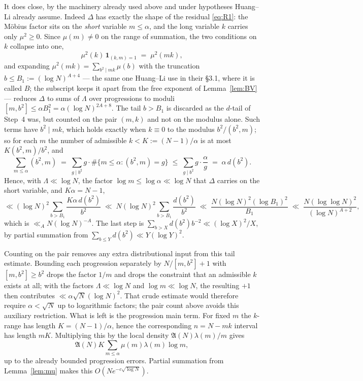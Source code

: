 \documentclass[11pt,a4paper]{article}
\theoremstyle{plain}
\theoremstyle{definition}
\theoremstyle{remark}
\newcommand{\AAA}{\mathfrak{A}}
\begin{document}
It does close, by the machinery already used above and under
hypotheses Huang--Li already assume. Indeed $\Delta$ has exactly the
shape of the residual \eqref{eq:R1}: the M\"obius factor sits on the
\emph{short} variable $m\le\alpha$, and the long variable $k$ carries
only $\mu^2\ge0$. Since $\mu(m)\neq0$ on the range of summation, the
two conditions on $k$ collapse into one,
\begin{equation}\label{eq:mu2mk}
  \mu^2(k)\,\mathbf 1_{(k,m)=1}\;=\;\mu^2(mk),
\end{equation}
and expanding $\mu^2(mk)=\sum_{b^2\mid mk}\mu(b)$ with the truncation
$b\le B_1:=(\log N)^{A+4}$ --- the same one Huang--Li use in their
\S3.1, where it is called $B$; the subscript keeps it apart from the
free exponent of Lemma~\ref{lem:BV} --- reduces $\Delta$ to sums of
$\Lambda$ over progressions to moduli
$[m,b^2]\le\alpha B_1^2=\alpha(\log N)^{2A+8}$. The tail $b>B_1$ is
discarded as the $d$-tail of Step~4 was, but counted on the pair
$(m,k)$ and not on the modulus alone. Such terms have $b^2\mid mk$,
which holds exactly when $k\equiv0$ to the modulus $b^2/(b^2,m)$; so
for each $m$ the number of admissible $k<K:=(N-1)/\alpha$ is at most
$K(b^2,m)/b^{2}$, and
\[
  \sum_{m\le\alpha}(b^2,m)
   \;=\;\sum_{g\mid b^2}g\cdot\#\{m\le\alpha:(b^2,m)=g\}
   \;\le\;\sum_{g\mid b^2}g\cdot\frac{\alpha}{g}
   \;=\;\alpha\,d(b^2).
\]
Hence, with $\Lambda\ll\log N$, the factor $\log m\le\log\alpha\ll\log
N$ that $\Delta$ carries on the short variable, and $K\alpha=N-1$,
\[
  \ll(\log N)^{2}\!\!\sum_{b>B_1}\frac{K\alpha\,d(b^2)}{b^{2}}
  \;\ll\;N(\log N)^{2}\!\!\sum_{b>B_1}\frac{d(b^2)}{b^{2}}
  \;\ll\;\frac{N(\log N)^{2}(\log B_1)^{2}}{B_1}
  \;\ll\;\frac{N(\log\log N)^{2}}{(\log N)^{A+2}},
\]
which is $\ll_AN(\log N)^{-A}$. The last step is
$\sum_{b>X}d(b^2)b^{-2}\ll(\log X)^2/X$, by partial summation from
$\sum_{b\le Y}d(b^2)\ll Y(\log Y)^2$.

Counting on the pair removes any extra distributional input from this
tail estimate. Bounding each
progression separately by $N/[m,b^2]+1$ with $[m,b^2]\ge b^2$ drops the
factor $1/m$ and drops the constraint that an admissible $k$ exists at
all; with the factors $\Lambda\ll\log N$ and
$\log m\ll\log N$, the resulting $+1$ then contributes
$\ll\alpha\sqrt N(\log N)^2$.  That crude estimate would therefore
require $\alpha<\sqrt N$ up to logarithmic factors; the
pair count above avoids this auxiliary restriction. What is left is the progression main term.  For fixed $m$ the $k$-range
has length $K=(N-1)/\alpha$, hence the corresponding $n=N-mk$ interval
has length $mK$.  Multiplying this by the local density
$\AAA(N)\lambda(m)/m$ gives
\[
 \AAA(N)K\sum_{m\le\alpha}\mu(m)\lambda(m)\log m,
\]
up to the already bounded progression errors.  Partial summation from
Lemma~\ref{lem:mu} makes this $O(Ne^{-c\sqrt{\log N}})$.
\end{document}
